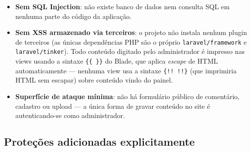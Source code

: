 \documentclass[11pt,a4paper]{article}
\begin{document}
\begin{itemize}[leftmargin=2em]
    \item \textbf{Sem SQL Injection}: não existe banco de dados nem consulta SQL em nenhuma
          parte do código da aplicação.
    \item \textbf{Sem XSS armazenado via terceiros}: o projeto não instala nenhum plugin de
          terceiros (as únicas dependências PHP são o próprio \texttt{laravel/framework} e
          \texttt{laravel/tinker}). Todo conteúdo digitado pelo administrador é impresso nas
          views usando a sintaxe \texttt{\{\{ \}\}} do Blade, que aplica \emph{escape} de HTML
          automaticamente — nenhuma view usa a sintaxe \texttt{\{!! !!\}} (que imprimiria HTML
          sem escapar) sobre conteúdo vindo do painel.
    \item \textbf{Superfície de ataque mínima}: não há formulário público de comentário,
          cadastro ou upload — a única forma de gravar conteúdo no site é autenticando-se como
          administrador.
\end{itemize}

\subsection{Proteções adicionadas explicitamente}
\end{document}
